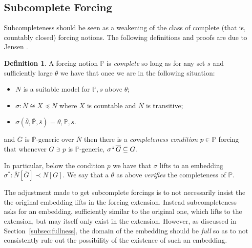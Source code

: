 \documentclass{amsart}
\theoremstyle{definition}
\newtheorem{definition}[theorem]{Definition}
\theoremstyle{remark}
\renewcommand{\P}{\mathbb{P}}
\newcommand{\N}{{\overline{N}}}
\newcommand{\G}{\overline{G}}
\begin{document}
\subsection{Subcomplete Forcing} \label{subsec:subcomplete}
Subcompleteness should be seen as a weakening of the class of complete (that is, countably closed) forcing notions. The following definitions and proofs are due to Jensen \cite[Chapter 3]{Jensen:2012fr}.


 
\begin{definition} A forcing notion $\P$ is \emph{complete} so long as
for any set $s$ and sufficiently large $\theta$ we have that once we are in the following situation: \begin{itemize}
	\item $N$ is a suitable model for $\P,s$ above $\theta$;
	\item $\sigma: \N \cong X \preccurlyeq N$ where $X$ is countable and $\N$ is transitive;
	\item $\sigma(\overline \theta, \overline{\P}, \overline s)=\theta, \P, s$.
\end{itemize}
and $\G$ is $\overline{\P}$-generic over $\N$ then there is a \emph{completeness condition} $p \in \P$ forcing that whenever $G \ni p$ is $\P$-generic, $\sigma ``\, \G \subseteq G$. 

In particular, below the condition $p$ we have that $\sigma$ lifts to an embedding $\sigma^*:\N[\G] \prec N[G]$.
We say that a $\theta$ as above \emph{verifies} the completeness of $\P$.
\end{definition}
The adjustment made to get subcomplete forcings is to not necessarily insist the the original embedding lifts in the forcing extension. Instead subcompleteness asks for an embedding, sufficiently similar
to the original one, which lifts to the extension, but may itself only exist in the extension.
However, as discussed in Section~\ref{subsec:fullness}, the domain of the embedding should be \emph{full} so as to not consistently rule out the possibility of the existence of such an embedding. 
\end{document}
